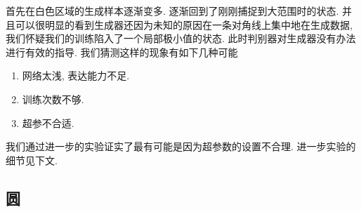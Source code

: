 \documentclass[lang=cn,11pt]{elegantpaper}
\begin{document}
首先在白色区域的生成样本逐渐变多. 逐渐回到了刚刚捕捉到大范围时的状态. 并且可以很明显的看到生成器还因为未知的原因在一条对角线上集中地在生成数据, 我们怀疑我们的训练陷入了一个局部极小值的状态. 此时判别器对生成器没有办法进行有效的指导. 我们猜测这样的现象有如下几种可能

\begin{enumerate}
	\item 网络太浅, 表达能力不足.
	\item 训练次数不够.
	\item 超参不合适.
\end{enumerate}

\noindent 我们通过进一步的实验证实了最有可能是因为超参数的设置不合理. 进一步实验的细节见下文. 




\subsection{圆}
\end{document}
